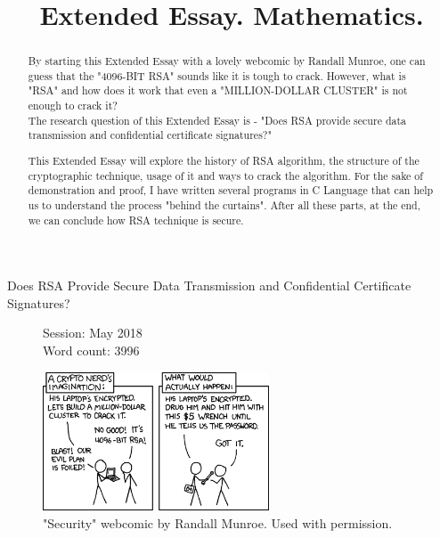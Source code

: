 \documentclass[a4paper, 12pt]{article}
\title{Extended Essay. Mathematics.}
\date{}
\begin{document}

\maketitle

\begin{center}
Does RSA Provide Secure Data Transmission and Confidential Certificate Signatures?
\end{center}

\begin{flushleft}
\begin{figure}[b]
  Session: May 2018\\
  Word count: 3996\\
\end{figure}
\end{flushleft}

\newpage


\tableofcontents
\newpage
\listoffigures
\listoftables
\lstlistoflistings


\newpage
{}

\begin{figure}[h!]
  \begin{center}
    \includegraphics[width=0.6\textwidth]{xkcd_security.png}
    \caption{"Security" webcomic by Randall Munroe. Used with permission.\cite{xkcd}}
    \label{fig:xkcd}
    \end{center}
  \end{figure}

\begin{abstract}
\label{sec:abstract}

By starting this Extended Essay with a lovely webcomic by Randall Munroe, one can guess that the "4096-BIT RSA" sounds like it is tough to crack.
However, what is "RSA" and how does it work that even a "MILLION-DOLLAR CLUSTER" is not enough to crack it?\\
The research question of this Extended Essay is - "Does RSA provide secure data transmission
and confidential certificate signatures?"

This Extended Essay will explore the history of RSA
algorithm, the structure of the cryptographic technique, usage of it and ways to crack the algorithm.
For the sake of demonstration and proof, I have written several programs in C Language\cite{Clang} that can help us to understand the process "behind the curtains". After all these parts, at the end, we can conclude how RSA technique is secure.
\end{abstract}
\end{document}
